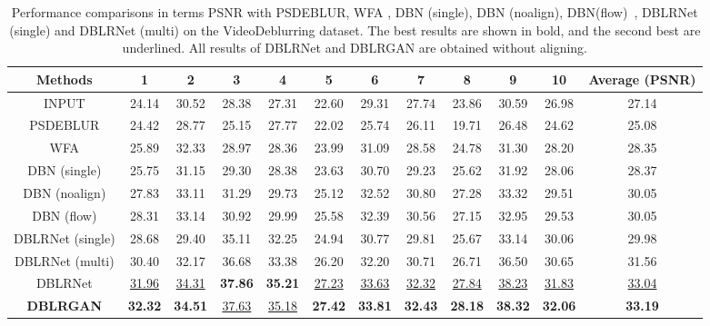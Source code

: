 \documentclass[journal]{IEEEtran}
\begin{document}
\begin{table*}[htb] 
  \centering
  \caption{Performance comparisons in terms PSNR with PSDEBLUR, WFA \cite{delbracio2015burst}, DBN (single), DBN (noalign), DBN(flow)~\cite{su2016deep}, DBLRNet (single) and DBLRNet (multi) on the VideoDeblurring dataset. The best results are shown in bold, and the second best are underlined. All results of DBLRNet and DBLRGAN are obtained without aligning.}
    \begin{tabular}{c|cccccccccc|c}
    \toprule
  Methods   & 1 & 2 & 3 & 4 & 5 & 6 & 7 & 8 & 9 & 10 & Average (PSNR) \\
    \midrule
    INPUT   & 24.14 & 30.52  & 28.38  & 27.31  & 22.60  & 29.31  & 27.74  & 23.86 & 30.59 & 26.98 & 27.14 \\
    PSDEBLUR   & 24.42  & 28.77  & 25.15  & 27.77  & 22.02  & 25.74  & 26.11  & 19.71 & 26.48 & 24.62 & 25.08  \\
    WFA  & 25.89  & 32.33  & 28.97  & 28.36  & 23.99  & 31.09  & 28.58  & 24.78 & 31.30 & 28.20 & 28.35 \\
    DBN (single)   & 25.75  & 31.15  & 29.30  & 28.38  & 23.63  & 30.70  & 29.23  & 25.62 & 31.92 & 28.06 & 28.37 \\
    DBN (noalign)  & 27.83  & 33.11  & 31.29  & 29.73  & 25.12  & 32.52  & 30.80  & 27.28 & 33.32 & 29.51 & 30.05 \\
    DBN (flow)  & 28.31  & 33.14  & 30.92  & 29.99  & 25.58  & 32.39  & 30.56  & 27.15 & 32.95 & 29.53 & 30.05 \\
  \hline
    DBLRNet (single)  & 28.68  & 29.40  & 35.11  & 32.25  & 24.94  & 30.77  &  29.81 & 25.67 & 33.14 & 30.06 & 29.98  \\
    DBLRNet (multi)  & 30.40  & 32.17  & 36.68  & 33.38  & 26.20  &  32.20 & 30.71  & 26.71 & 36.50 & 30.65 & 31.56 \\
    DBLRNet   & \underline{31.96}  & \underline{34.31}  & \textbf{37.86}  & \textbf{35.21}  & \underline{27.23}  & \underline{33.63}  & \underline{32.32}  & \underline{27.84} & \underline{38.23} & \underline{31.83} & \underline{33.04} \\
   \hline
    \textbf{DBLRGAN} & \textbf{32.32}  &\textbf{34.51}  & \underline{37.63}  & \underline{35.18}  & \textbf{27.42}  & \textbf{33.81}  & \textbf{32.43}  & \textbf{28.18} & \textbf{38.32} & \textbf{32.06} & \textbf{33.19} \\
    \bottomrule
    \end{tabular}
  \label{table3}
\end{table*}
\end{document}
